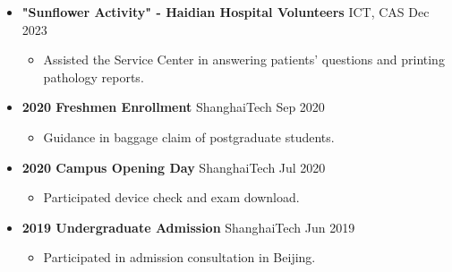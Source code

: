 \documentclass[a4paper,10pt]{ctexart} %
\begin{document}
    \begin{itemize}
        \item \textbf{"Sunflower Activity" - Haidian Hospital Volunteers} \hfill ICT, CAS \quad Dec 2023
            \begin{small} \begin{itemize}
                \item Assisted the Service Center in answering patients' questions and printing pathology reports.
            \end{itemize} \end{small}
        \item \textbf{2020 Freshmen Enrollment} \hfill ShanghaiTech \quad Sep 2020
            \begin{small} \begin{itemize}
                \item Guidance in baggage claim of postgraduate students.
            \end{itemize} \end{small}
        \item \textbf{2020 Campus Opening Day} \hfill ShanghaiTech \quad Jul 2020
            \begin{small} \begin{itemize}
                \item Participated device check and exam download.
            \end{itemize} \end{small}
        \item \textbf{2019 Undergraduate Admission} \hfill ShanghaiTech \quad Jun 2019
            \begin{small} \begin{itemize}
                \item Participated in admission consultation in Beijing.
            \end{itemize} \end{small}
    \end{itemize}
\end{document}
